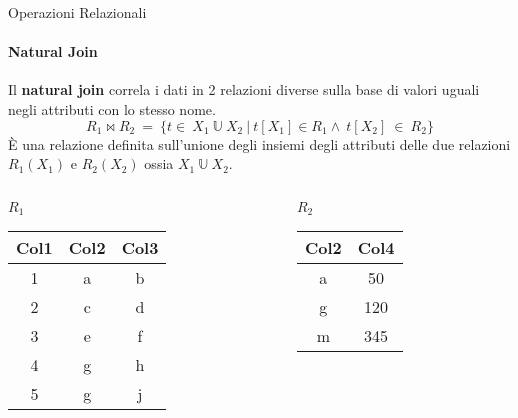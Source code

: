     \begin{frame}{Operazioni Relazionali}
        \framesubtitle{Natural Join}
        Il \textbf{natural join} correla i dati in 2 relazioni diverse sulla base di valori uguali negli attributi con lo stesso nome.
        \[ R_1 \bowtie R_2~=~\{ t \in~X_1~ \mathbb{U}~X_2~|~t[X_1] \in R_1 \land~t[X_2]~\in~R_2 \} \]
        \`E una relazione definita sull'unione degli insiemi degli attributi delle due relazioni $R_1(X_1)$ e $R_2(X_2)$ ossia $X_1~\mathbb{U}~X_2$.
        \begin{columns}
            \begin{column}{0.48\textwidth}
                \centering
                {\small $R_1$}
                \newline
        \begin{tabular}{|c|c|c|}
            \hline
            \rowcolor{cyan!30}Col1 & Col2 & Col3 \\
            \hline
            1 & a & b \\ \hline
            2 & c & d \\ \hline
            3 & e & f \\ \hline
            4 & g & h \\ \hline
            5 & g & j \\ \hline
            \end{tabular}
            \end{column}
            \begin{column}{0.48\textwidth}
                \centering
                {\small $R_2$}
                \newline
                \begin{tabular}{|c|c|}
                    \hline
                    \rowcolor{cyan!30} Col2 & Col4 \\ \hline
                    a & 50 \\ \hline
                    g & 120 \\ \hline
                    m & 345 \\ \hline
                    \end{tabular}
            \end{column}
        \end{columns}
    \end{frame}
